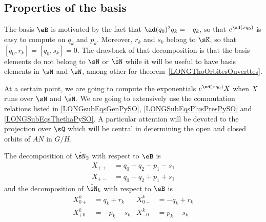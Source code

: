 %
\subsection{Properties of the basis}
%


The basis $\eB$ is motivated by the fact that $\ad(q_0)^2q_k=-q_k$, so that $ e^{\ad(xq_0)}$ is easy to compute on $q_k$ and $p_k$. Moreover, $r_k$ and $s_k$ belong to $\sK$, so that $[q_0,r_k]=[q_0,s_k]=0$. The drawback of that decomposition is that the basis elements do not belong to $\sN$ or $\bar\sN$ while it will be useful to have basis elements in $\sN$ and $\bar\sN$, among other for theorem~\ref{LONGThoOrbitesOuverttes}.

At a certain point, we are going to compute the exponentials $ e^{\ad(xq_0)}X$ when $X$ runs over $\sN$ and $\bar\sN$. We are going to extensively use the commutation relations listed in \eqref{LONGsubEqsGenPySO}, \eqref{LONGSubEqsPlusPresPySO} and \eqref{LONGSubEqsThethaPySO}. A particular attention will be devoted to the projection over $\sQ$ which will be central in determining the open and closed orbits of $AN$ in $G/H$.

\begin{lemma}		\label{LONGLemDecomptsNDanseB}
	The decomposition of $\tilde\sN_2$ with respect to $\eB$ is
	\begin{subequations}		\label{LONGSubeqsDecompXqps}
		\begin{align}
			X_{++} & =q_0-q_2-p_1-s_1 \\
			X_{+-} & =q_0-q_2+p_1+s_1
		\end{align}
	\end{subequations}
	and the decomposition of $\tilde\sN_k$ with respect to $\eB$ is
	\begin{subequations}
		\begin{align}
			X_{0+}^k & = q_k+r_k  & X_{0-}^k & =-q_k+r_k		\label{LONGsubEqqrkXzpegal} \\
			X_{+0}^k & = -p_k-s_k & X_{-0}^k & = p_k-s_k
		\end{align}
	\end{subequations}

\end{lemma}


